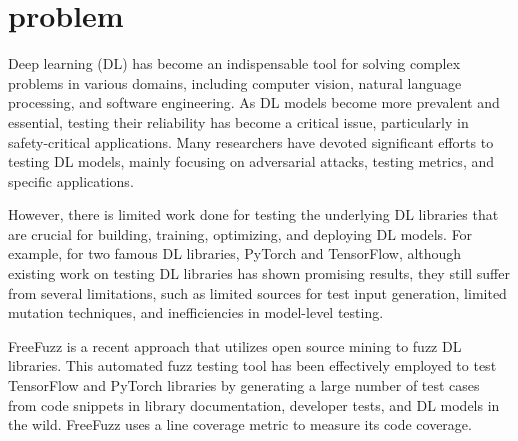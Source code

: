 \documentclass[sigconf]{acmart}
\begin{document}



\maketitle

\section{problem}
Deep learning (DL) has become an indispensable tool for solving complex problems in various domains, including computer vision\cite{p1,p2}, natural language processing\cite{p3,p4}, and software engineering\cite{p5,p6,p7,p8}. 
As DL models become more prevalent and essential, testing their reliability has become a critical issue, particularly in safety-critical applications. 
Many researchers have devoted significant efforts to testing DL models, mainly focusing on adversarial attacks\cite{p9,p10,p11}, testing metrics\cite{p12,p13,p14}, and specific applications\cite{p15,p16,p17}. 

However, there is limited work done for testing the underlying DL libraries that are crucial for building, training, optimizing, and deploying DL models. 
For example, for two famous DL libraries, PyTorch and TensorFlow, although existing work on testing DL libraries has shown promising results, 
they still suffer from several limitations, such as limited sources for test input generation, limited mutation techniques, and inefficiencies in model-level testing\cite{p18,p19}. 

FreeFuzz is a recent approach that utilizes open source mining to fuzz DL libraries\cite{w1}. 
This automated fuzz testing tool has been effectively employed to test TensorFlow and PyTorch libraries by generating a large number of test cases from code snippets in library documentation, developer tests, and DL models in the wild. 
FreeFuzz uses a line coverage metric to measure its code coverage.
\end{document}
